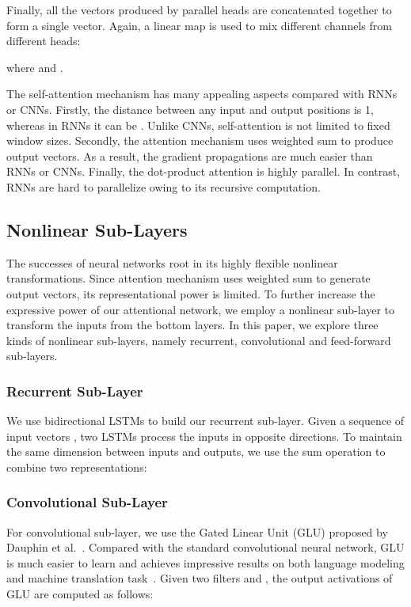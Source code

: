 \documentclass[letterpaper]{article} \usepackage{aaai18}  \usepackage{times}  \usepackage{helvet}  \usepackage{courier}  \usepackage{url}  \usepackage{graphicx}  \frenchspacing  \setlength{\pdfpagewidth}{8.5in}  \setlength{\pdfpageheight}{11in}  \usepackage{latexsym}
\begin{document}
Finally, all the vectors produced by parallel heads are concatenated together to form a single vector. Again, a linear map is used to mix different channels from different heads:

where  and .

The self-attention mechanism has many appealing aspects compared with RNNs or CNNs. Firstly, the distance between any input and output positions is 1, whereas in RNNs it can be . Unlike CNNs, self-attention is not limited to fixed window sizes. Secondly, the attention mechanism uses weighted sum to produce output vectors. As a result, the gradient propagations are much easier than RNNs or CNNs. Finally, the dot-product attention is highly parallel. In contrast, RNNs are hard to parallelize owing to its recursive computation.

\subsection{Nonlinear Sub-Layers}
The successes of neural networks root in its highly flexible nonlinear transformations. Since attention mechanism uses weighted sum to generate output vectors, its representational power is limited. To further increase the expressive power of our attentional network, we employ a nonlinear sub-layer to transform the inputs from the bottom layers. In this paper, we explore three kinds of nonlinear sub-layers, namely recurrent, convolutional and feed-forward sub-layers.

\subsubsection{Recurrent Sub-Layer}
We use bidirectional LSTMs to build our recurrent sub-layer. Given a sequence of input vectors , two LSTMs process the inputs in opposite directions. To maintain the same dimension between inputs and outputs, we use the sum operation to combine two representations:


\subsubsection{Convolutional Sub-Layer}
For convolutional sub-layer, we use the Gated Linear Unit (GLU) proposed by Dauphin et al.~. Compared with the standard convolutional neural network, GLU is much easier to learn and achieves impressive results on both language modeling and machine translation task~\cite{dauphin2016language,gehring2017convolutional}. Given two filters  and , the output activations of GLU are computed as follows:
\end{document}
